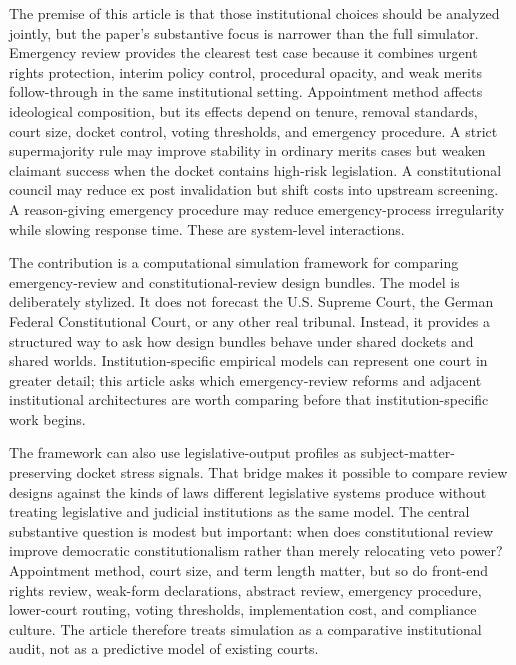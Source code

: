 \documentclass[
  journal=small,
  manuscript=research-article,
  year=2026
]{cup-journal}
\begin{document}
The premise of this article is that those institutional choices should be analyzed jointly, but the paper's substantive focus is narrower than the full simulator. Emergency review provides the clearest test case because it combines urgent rights protection, interim policy control, procedural opacity, and weak merits follow-through in the same institutional setting. Appointment method affects ideological composition, but its effects depend on tenure, removal standards, court size, docket control, voting thresholds, and emergency procedure. A strict supermajority rule may improve stability in ordinary merits cases but weaken claimant success when the docket contains high-risk legislation. A constitutional council may reduce ex post invalidation but shift costs into upstream screening. A reason-giving emergency procedure may reduce emergency-process irregularity while slowing response time. These are system-level interactions.

The contribution is a computational simulation framework for comparing emergency-review and constitutional-review design bundles. The model is deliberately stylized. It does not forecast the U.S. Supreme Court, the German Federal Constitutional Court, or any other real tribunal. Instead, it provides a structured way to ask how design bundles behave under shared dockets and shared worlds. Institution-specific empirical models can represent one court in greater detail; this article asks which emergency-review reforms and adjacent institutional architectures are worth comparing before that institution-specific work begins.

The framework can also use legislative-output profiles as subject-matter-preserving docket stress signals. That bridge makes it possible to compare review designs against the kinds of laws different legislative systems produce without treating legislative and judicial institutions as the same model. The central substantive question is modest but important: when does constitutional review improve democratic constitutionalism rather than merely relocating veto power? Appointment method, court size, and term length matter, but so do front-end rights review, weak-form declarations, abstract review, emergency procedure, lower-court routing, voting thresholds, implementation cost, and compliance culture. The article therefore treats simulation as a comparative institutional audit, not as a predictive model of existing courts.
\end{document}
